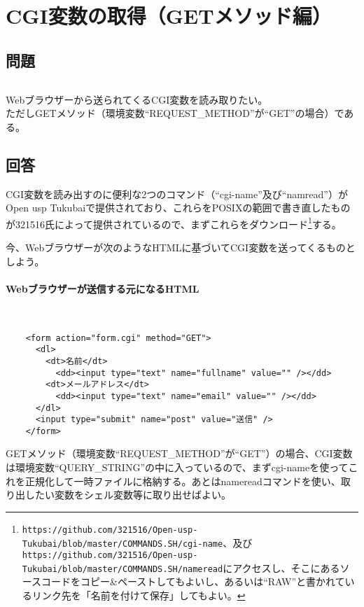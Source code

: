 \section{CGI変数の取得（GETメソッド編）}
\label{recipe:GETmethod}

\subsection*{問題}
\noindent
$\!\!\!\!\!$
\begin{grshfboxit}{160.0mm}
	Webブラウザーから送られてくるCGI変数を読み取りたい。\\
	ただしGETメソッド（環境変数``REQUEST\_{}METHOD''が``GET''の場合）である。
\end{grshfboxit}

\subsection*{回答}
CGI変数を読み出すのに便利な2つのコマンド（``cgi-name''及び``namread''）がOpen usp Tukubaiで提供されており、これらをPOSIXの範囲で書き直したものが321516氏によって提供されているので、まずこれらをダウンロード\footnote{\verb|https://github.com/321516/Open-usp-Tukubai/blob/master/COMMANDS.SH/cgi-name|、及び \\ \verb|https://github.com/321516/Open-usp-Tukubai/blob/master/COMMANDS.SH/nameread|にアクセスし、そこにあるソースコードをコピー\&{}ペーストしてもよいし、あるいは``RAW''と書かれているリンク先を「名前を付けて保存」してもよい。}する。

今、Webブラウザーが次のようなHTMLに基づいてCGI変数を送ってくるものとしよう。
\paragraph{Webブラウザーが送信する元になるHTML} 　\\
\begin{frameboxit}{160.0mm}
\begin{verbatim}
	<form action="form.cgi" method="GET">
	  <dl>
	    <dt>名前</dt>
	      <dd><input type="text" name="fullname" value="" /></dd>
	    <dt>メールアドレス</dt>
	      <dd><input type="text" name="email" value="" /></dd>
	  </dl>
	  <input type="submit" name="post" value="送信" />
	</form>
\end{verbatim}
\end{frameboxit}

GETメソッド（環境変数``REQUEST\_{}METHOD''が``GET''）の場合、CGI変数は環境変数``QUERY\_{}STRING''の中に入っているので、まずcgi-nameを使ってこれを正規化して一時ファイルに格納する。あとはnamereadコマンドを使い、取り出したい変数をシェル変数等に取り出せばよい。

